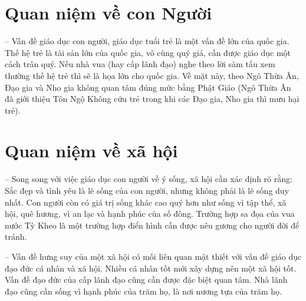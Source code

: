 \section{Quan niệm về con Người} %
\label{sec:78_79_con_nguoi}

-- Vấn đề giáo dục con người, giáo dục tuổi trẻ là một vấn đề lớn của quốc gia. Thế hệ trẻ là tài sản lớn của quốc gia, vô cùng quý giá, cần được giáo dục một cách trân quý. Nếu nhà vua (hay cấp lãnh đạo) nghe theo lời sàm tấu xem thường thế hệ trẻ thì sẽ là họa lớn cho quốc gia. Về mặt này, theo Ngô Thừa Ân, Đạo gia và Nho gia không quan tâm đúng mức bằng Phật Giáo (Ngô Thừa Ân đã giới thiệu Tôn Ngộ Không cứu trẻ trong khi các Đạo gia, Nho gia thì mưu hại trẻ).

\section{Quan niệm về xã hội} %
\label{sec:78_79_xa_hoi}

-- Song song với việc giáo dục con người về ý sống, xã hội cần xác định rõ rằng: Sắc đẹp và tình yêu là lẽ sống của con người, nhưng không phải là lẽ sống duy nhất. Con người còn có giá trị sống khác cao quý hơn như sống vì tập thể, xã hội, quê hương, vì an lạc và hạnh phúc của số đông. Trường hợp sa đọa của vua nước Tỳ Kheo là một trường hợp điển hình cần được nêu gương cho người đời để tránh.

-- Vấn đề hưng suy của một xã hội có mối liên quan mật thiết với vấn đề giáo dục đạo đức cá nhân và xã hội. Nhiều cá nhân tốt mới xây dựng nên một xã hội tốt. Vấn đề đạo đức của cấp lãnh đạo cũng cần được đặc biệt quan tâm. Nhà lãnh đạo cũng cần sống vì hạnh phúc của trăm họ, là nơi nương tựa của trăm họ.
